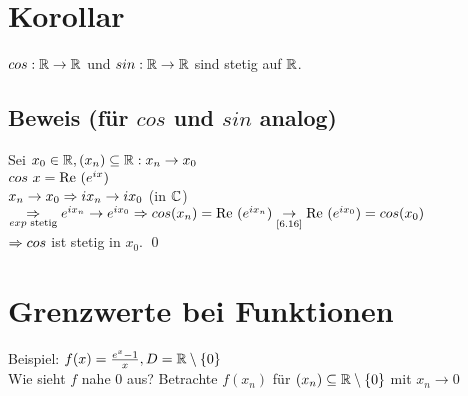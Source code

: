 \section{Korollar}\label{9.10}
$cos: \mathbb{R} \to \mathbb{R}$ und $sin: \mathbb{R} \to \mathbb{R}$ sind stetig auf $\mathbb{R}$.

\subsection*{Beweis (für $cos$ und $sin$ analog)}
Sei $x_0 \in \mathbb{R}, (x_n) \subseteq \mathbb{R}: x_n \to x_0$\\
$cos \ x = \text{Re }(e^{ix})$\\
$x_n \to x_0 \Rightarrow i x_n \to i x_0$ (in $\mathbb{C}$) $\underset{exp \text{ stetig}}{\Rightarrow} e^{i x_n} \to e^{i x_0} \Rightarrow cos(x_n) = \text{Re }(e^{i x_n}) \underset{\text{\ref{6.16}}}{\to} \text{Re }(e^{i x_0}) = cos(x_0)$\\
$\Rightarrow cos$ ist stetig in $x_0$. \qed

\newpage

{}
\section*{Grenzwerte bei Funktionen}
Beispiel: $f(x) = \frac{e^x-1}{x}, D = \mathbb{R} \setminus \{0\}$\\
Wie sieht $f$ nahe $0$ aus?\nl
Betrachte $f(x_n)$ für $(x_n) \subseteq \mathbb{R} \setminus \{0\}$ mit $x_n \to 0$

